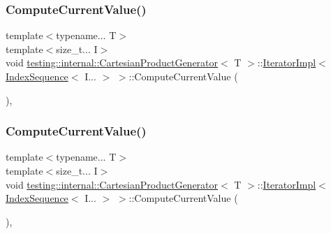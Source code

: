 \subsubsection{\texorpdfstring{ComputeCurrentValue()}{ComputeCurrentValue()}\hspace{0.1cm}{\footnotesize\ttfamily [1/2]}}
{\footnotesize\ttfamily template$<$typename... T$>$ \\
template$<$size\+\_\+t... I$>$ \\
void \mbox{\hyperlink{classtesting_1_1internal_1_1_cartesian_product_generator}{testing\+::internal\+::\+Cartesian\+Product\+Generator}}$<$ T $>$\+::\mbox{\hyperlink{classtesting_1_1internal_1_1_cartesian_product_generator_1_1_iterator_impl}{Iterator\+Impl}}$<$ \mbox{\hyperlink{structtesting_1_1internal_1_1_index_sequence}{Index\+Sequence}}$<$ I... $>$ $>$\+::Compute\+Current\+Value (\begin{DoxyParamCaption}{ }\end{DoxyParamCaption})\hspace{0.3cm}{\ttfamily [inline]}, {\ttfamily [private]}}

\mbox{\label{classtesting_1_1internal_1_1_cartesian_product_generator_1_1_iterator_impl_3_01_index_sequence_3_01_i_8_8_8_01_4_01_4_a0e6c088fed9a27254a657755d05bdcae}} 
\subsubsection{\texorpdfstring{ComputeCurrentValue()}{ComputeCurrentValue()}\hspace{0.1cm}{\footnotesize\ttfamily [2/2]}}
{\footnotesize\ttfamily template$<$typename... T$>$ \\
template$<$size\+\_\+t... I$>$ \\
void \mbox{\hyperlink{classtesting_1_1internal_1_1_cartesian_product_generator}{testing\+::internal\+::\+Cartesian\+Product\+Generator}}$<$ T $>$\+::\mbox{\hyperlink{classtesting_1_1internal_1_1_cartesian_product_generator_1_1_iterator_impl}{Iterator\+Impl}}$<$ \mbox{\hyperlink{structtesting_1_1internal_1_1_index_sequence}{Index\+Sequence}}$<$ I... $>$ $>$\+::Compute\+Current\+Value (\begin{DoxyParamCaption}{ }\end{DoxyParamCaption})\hspace{0.3cm}{\ttfamily [inline]}, {\ttfamily [private]}}

